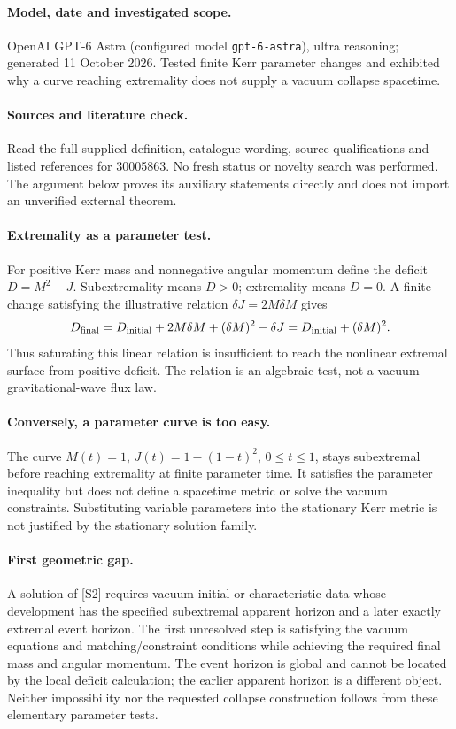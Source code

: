 \documentclass[11pt]{article}
\begin{document}
\paragraph{Model, date and investigated scope.}
OpenAI GPT-6 Astra (configured model \texttt{gpt-6-astra}), ultra reasoning; generated 11 October 2026. Tested finite Kerr parameter changes and exhibited why a curve reaching extremality does not supply a vacuum collapse spacetime.

\paragraph{Sources and literature check.}
Read the full supplied definition, catalogue wording, source qualifications and listed references for 30005863. No fresh status or novelty search was performed. The argument below proves its auxiliary statements directly and does not import an unverified external theorem.

\paragraph{Extremality as a parameter test.} For positive Kerr mass and nonnegative angular momentum define the deficit \(D=M^2-J\). Subextremality means \(D>0\); extremality means \(D=0\). A finite change satisfying the illustrative relation \(\delta J=2M\delta M\) gives
\[
 D_{\rm final}=D_{\rm initial}+2M\delta M+(\delta M)^2-\delta J
 =D_{\rm initial}+(\delta M)^2.
\]
Thus saturating this linear relation is insufficient to reach the nonlinear extremal surface from positive deficit. The relation is an algebraic test, not a vacuum gravitational-wave flux law.
\paragraph{Conversely, a parameter curve is too easy.} The curve \(M(t)=1\), \(J(t)=1-(1-t)^2\), \(0\leq t\leq1\), stays subextremal before reaching extremality at finite parameter time. It satisfies the parameter inequality but does not define a spacetime metric or solve the vacuum constraints. Substituting variable parameters into the stationary Kerr metric is not justified by the stationary solution family.
\paragraph{First geometric gap.} A solution of [S2] requires vacuum initial or characteristic data whose development has the specified subextremal apparent horizon and a later exactly extremal event horizon. The first unresolved step is satisfying the vacuum equations and matching/constraint conditions while achieving the required final mass and angular momentum. The event horizon is global and cannot be located by the local deficit calculation; the earlier apparent horizon is a different object. Neither impossibility nor the requested collapse construction follows from these elementary parameter tests.
\end{document}
